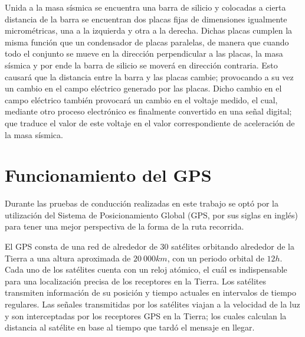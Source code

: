 Unida a la masa sísmica se encuentra una barra de silicio y colocadas a cierta distancia de la barra se encuentran dos placas fijas de dimensiones igualmente micrométricas, una a la izquierda y otra a la derecha. 
Dichas placas cumplen la misma función que un condensador de placas paralelas, de manera que cuando todo el conjunto se mueve en la dirección perpendicular a las placas, la masa sísmica y por ende la barra de silicio se moverá en dirección contraria. 
Esto causará que la distancia entre la barra y las placas cambie; provocando a su vez un cambio en el campo eléctrico generado por las placas.
Dicho cambio en el campo eléctrico también provocará un cambio en el voltaje medido, el cual, mediante otro proceso electrónico es finalmente convertido en una señal digital; que traduce el valor de este voltaje en el valor correspondiente de aceleración de la masa sísmica.\\

\section{Funcionamiento del GPS}

Durante las pruebas de conducción realizadas en este trabajo se optó por la utilización del Sistema de Posicionamiento Global (GPS, por sus siglas en inglés) para tener una mejor perspectiva de la forma de la ruta recorrida.

El GPS consta de una red de alrededor de 30 satélites orbitando alrededor de la Tierra a una altura aproximada de $20\ 000km$, con un periodo orbital de $12h$. 
Cada uno de los satélites cuenta con un reloj atómico, el cuál es indispensable para una localización precisa de los receptores en la Tierra. 
Los satélites transmiten información de su posición y tiempo actuales en intervalos de tiempo regulares. 
Las señales transmitidas por los satélites viajan a la velocidad de la luz y son interceptadas por los receptores GPS en la Tierra; los cuales calculan la distancia al satélite en base al tiempo que tardó el mensaje en llegar.

